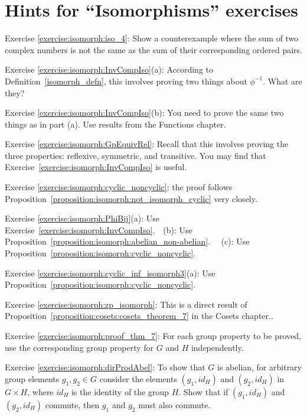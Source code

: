 \section{Hints for ``Isomorphisms'' exercises}\label{sec:isomorph:hints} 


\noindent Exercise \ref{exercise:isomorph:iso_4}:  Show a counterexample where the sum of two complex numbers is not the same as the sum of their corresponding ordered pairs.

\noindent Exercise \ref{exercise:isomorph:InvCompIso}(a):  According to Definition~\ref{isomorph_defn}, this involves proving two things about $\phi^{-1}$.  What are they?

\noindent Exercise \ref{exercise:isomorph:InvCompIso}(b): You need to prove the same two things as in part (a).  Use results from the Functions chapter.

\noindent Exercise \ref{exercise:isomorph:GpEquivRel}:   Recall that this involves proving the three properties: reflexive, symmetric, and transitive. You may find that Exercise~\ref{exercise:isomorph:InvCompIso}  is useful.

\noindent Exercise \ref{exercise:isomorph:cyclic_noncyclic}:   the proof follows Proposition~\ref{proposition:isomorph:not_isomorph_cyclic} very closely.

\noindent Exercise \ref{exercise:isomorph:PhiBij}(a): Use Exercise~\ref{exercise:isomorph:InvCompIso}.~~(b):  Use Proposition~\ref{proposition:isomorph:abelian_non-abelian}. ~~(c):  Use Proposition~\ref{proposition:isomorph:cyclic_noncyclic}. 

\noindent Exercise \ref{exercise:isomorph:cyclic_inf_isomorph3}(a): Use Proposition~\ref{proposition:isomorph:cyclic_noncyclic}.

\noindent Exercise \ref{exercise:isomorph:zp_isomorph}: This  is a direct result of Proposition~\ref{proposition:cosets:cosets_theorem_7} in the Cosets chapter..

\noindent Exercise \ref{exercise:isomorph:proof_thm_7}: For each group property to be proved, use the corresponding group property for $G$ and $H$ independently.

\noindent Exercise \ref{exercise:isomorph:dirProdAbel}: To show that $G$ is abelian, for arbitrary group elements $g_1, g_2 \in G$ consider the elements $(g_1, id_H)$ and $(g_2,id_H)$ in $G \times H$, where $id_H$ is the identity of the group $H$.  Show that if $(g_1, id_H)$ and $(g_2,id_H)$ commute, then $g_1$ and $g_2$ must also commute. 


